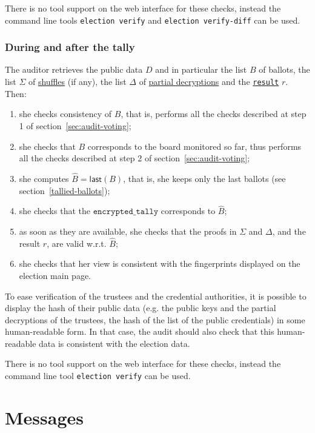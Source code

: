 \documentclass[a4paper]{article}
\newcommand{\etally}{\texttt{encrypted\_tally}}
\newcommand{\result}{\texttt{result}}
\begin{document}
There is no tool support on the web interface for these checks,
instead the command line tools \texttt{election verify} and
\texttt{election verify-diff} can be used.

\subsubsection{During and after the tally}
The auditor retrieves the public data $D$ and in particular the list
$B$ of ballots, the list $\Sigma$ of \hyperref[shuffles]{shuffles} (if
any), the list $\Delta$ of \hyperref[partial-decryptions]{partial
  decryptions} and the \hyperref[election-result]{\result} $r$. Then:

  \begin{enumerate}
   \item she checks consistency of $B$, that is, performs all
    the checks described at step 1 of section~\ref{sec:audit-voting};
  \item she checks that $B$ corresponds to the board
      monitored so far, thus performs all
    the checks described at step 2 of section~\ref{sec:audit-voting};
    \item she computes $\hat{B}=\textsf{last}(B)$, that is, she keeps
      only the last ballots (see section~\ref{tallied-ballots});
      \item she checks that the   \hyperref[tally]{$\etally$}
        corresponds to $\hat{B}$;
 \item as soon as they are available, she checks that the proofs in $\Sigma$ and $\Delta$, and the result $r$, are valid
   w.r.t. $\hat{B}$;
      \item she checks that her view is consistent with the fingerprints
      displayed on the election main page.
\end{enumerate}
To ease verification of the trustees and the credential authorities,
it is possible to display the hash of their public data (e.g. the
public keys and the partial decryptions of the trustees, the hash of
the list of the public credentials) in some human-readable form. In
that case, the audit should also check that this human-readable data is
consistent with the election data.

There is no tool support on the web interface for these checks,
instead the command line tool \texttt{election verify} can be used.

\section{Messages}
\label{messages}
\end{document}
